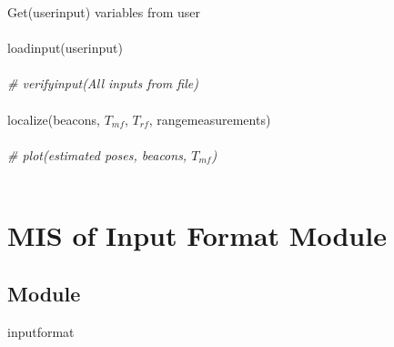 \documentclass[12pt, titlepage]{article}
\begin{document}
\noindent Get(user\textunderscore input) variables from user\\\\
\noindent load\textunderscore input(user\textunderscore input)\\\\
\noindent \textit{\# verify\textunderscore input(All inputs from file)}\\\\
\noindent localize(beacons, $T_{mf}$, $T_{rf}$, range\textunderscore measurements)\\\\
\noindent \textit{\# plot(estimated poses, beacons, $T_{mf}$)}\\\\








\newpage

\section{MIS of Input Format Module} \label{M_Input} 



\subsection{Module}

input\textunderscore format
\end{document}
